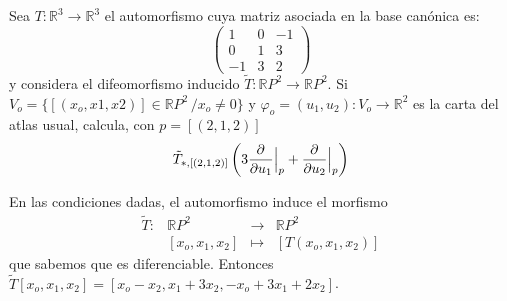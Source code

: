\begin{ejer}[2.16] Sea $T : \mathbb R^3 \to \mathbb R^3$ el automorfismo cuya matriz asociada en la base can\'onica es:
$$\begin{pmatrix} 1&  0 & -1 \\ 0 & 1 & 3 \\ -1&  3 & 2\end{pmatrix}$$
y considera el difeomorfismo inducido $\tilde{T}: \mathbb RP ^2 \to \mathbb RP^ 2$. Si $V_o = \{[(x_o, x1, x2)] \in \mathbb RP^2 \, / x_o \neq 0\}$ y $\varphi_o = (u_1, u_2) : V_o \longrightarrow \mathbb R^2$ es la carta del atlas usual, calcula, con $p=[(2,1,2)]$
$$\tilde{T}_{*,[(2,1,2)]} \left( 3 \dfrac{\partial^{} }{\partial u_1} \Big| _{p} + \dfrac{\partial^{} }{\partial u_2} \Big|_{p}\right)$$
\end{ejer}
\begin{sol}
    En las condiciones dadas, el automorfismo induce el morfismo
    $$\begin{array}{rrcl}
         \tilde{T} : &  \mathbb R P^2 & \longrightarrow &\mathbb R P^2  \\
         & [x_o,x_1,x_2] & \longmapsto & [T(x_o,x_1,x_2)]
    \end{array}$$
    que sabemos que es diferenciable. Entonces $\tilde{T}[x_o, x_1, x_2]=[x_o-x_2, x_1+3x_2,-x_o+3x_1+2x_2]$.


\end{sol}
